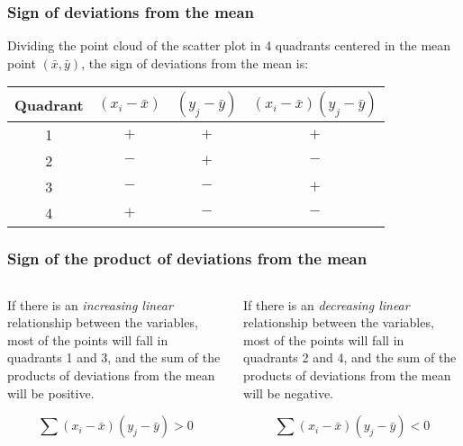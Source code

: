 \begin{frame}
\frametitle{Sign of deviations from the mean}
Dividing the point cloud of the scatter plot in 4 quadrants centered in the mean point $(\bar x, \bar y)$, the sign of
deviations from the mean is:
\begin{center}
\begin{tabular}{cccc}
Quadrant & $(x_i-\bar x)$ & $(y_j-\bar y)$ & $(x_i-\bar x)(y_j-\bar y)$\\
\hline
1 & $+$ & $+$ & \alert{$+$}\\
2 & $-$ & $+$ & \alert{$-$}\\
3 & $-$ & $-$ & \alert{$+$}\\
4 & $+$ & $-$ & \alert{$-$}\\
\hline
\end{tabular}

\resizebox{0.4\textwidth}{!}{}
\end{center}
\end{frame}


\begin{frame}
\frametitle{Sign of the product of deviations from the mean}
\begin{columns}[t]
\begin{column}{0.5\textwidth}
If there is an \emph{increasing linear} relationship between the variables, most of the points will fall in quadrants 1
and 3, and the sum of the products of deviations from the mean will be positive.

\centering
{}

$$\sum(x_i-\bar x)(y_j-\bar y) >0$$
\end{column}

\begin{column}{0.5\textwidth}
If there is an \emph{decreasing linear} relationship between the variables, most of the points will fall in quadrants 2
and 4, and the sum of the products of deviations from the mean will be negative.

\centering
{}

$$\sum(x_i-\bar x)(y_j-\bar y) <0$$
\end{column}
\end{columns}
\end{frame}


